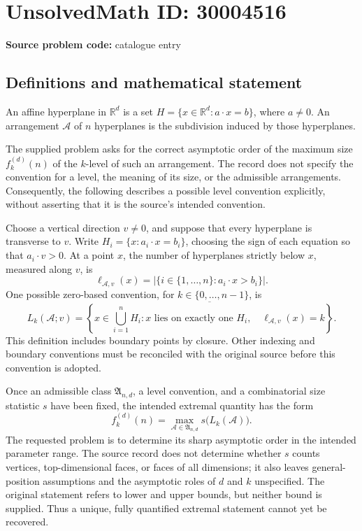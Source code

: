 \documentclass[11pt]{article}
\newcommand{\R}{\mathbb{R}}
\begin{document}
\section*{UnsolvedMath ID: 30004516}
\textbf{Source problem code:} catalogue entry
\subsection{Definitions and mathematical statement}
An affine hyperplane in \(\R^d\) is a set \(H=\{x\in\R^d:a\cdot x=b\}\), where \(a\ne0\). An arrangement \(\mathcal A\) of \(n\) hyperplanes is the subdivision induced by those hyperplanes.

The supplied problem asks for the correct asymptotic order of the maximum size \(f_k^{(d)}(n)\) of the \(k\)-level of such an arrangement. The record does not specify the convention for a level, the meaning of its size, or the admissible arrangements. Consequently, the following describes a possible level convention explicitly, without asserting that it is the source's intended convention.

Choose a vertical direction \(v\ne0\), and suppose that every hyperplane is transverse to \(v\). Write \(H_i=\{x:a_i\cdot x=b_i\}\), choosing the sign of each equation so that \(a_i\cdot v>0\). At a point \(x\), the number of hyperplanes strictly below \(x\), measured along \(v\), is
\[
\ell_{\mathcal A,v}(x)=\bigl|\{i\in\{1,\ldots,n\}:a_i\cdot x>b_i\}\bigr|.
\]
One possible zero-based convention, for \(k\in\{0,\ldots,n-1\}\), is
\[
L_k(\mathcal A;v)=\overline{\left\{x\in\bigcup_{i=1}^nH_i:
 x\text{ lies on exactly one }H_i,\quad \ell_{\mathcal A,v}(x)=k\right\}}.
\]
This definition includes boundary points by closure. Other indexing and boundary conventions must be reconciled with the original source before this convention is adopted.

Once an admissible class \(\mathfrak A_{n,d}\), a level convention, and a combinatorial size statistic \(s\) have been fixed, the intended extremal quantity has the form
\[
f_k^{(d)}(n)=\max_{\mathcal A\in\mathfrak A_{n,d}}s\bigl(L_k(\mathcal A)\bigr).
\]
The requested problem is to determine its sharp asymptotic order in the intended parameter range. The source record does not determine whether \(s\) counts vertices, top-dimensional faces, or faces of all dimensions; it also leaves general-position assumptions and the asymptotic roles of \(d\) and \(k\) unspecified. The original statement refers to lower and upper bounds, but neither bound is supplied. Thus a unique, fully quantified extremal statement cannot yet be recovered.
\end{document}
